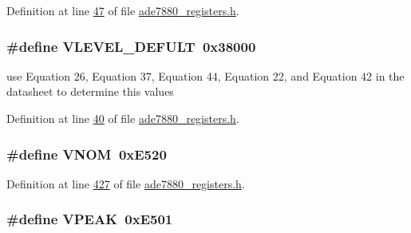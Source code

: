 Definition at line \hyperlink{a00036_source_l00047}{47} of file \hyperlink{a00036_source}{ade7880\-\_\-registers.\-h}.

\hypertarget{a00036_a489507ec5a9fe148bbc1b61afc07f27a}{
\subsubsection[{V\-L\-E\-V\-E\-L\-\_\-\-D\-E\-F\-U\-L\-T}]{\setlength{\rightskip}{0pt plus 5cm}\#define V\-L\-E\-V\-E\-L\-\_\-\-D\-E\-F\-U\-L\-T~0x38000}}\label{de/d8c/a00036_a489507ec5a9fe148bbc1b61afc07f27a}


use Equation 26, Equation 37, Equation 44, Equation 22, and Equation 42 in the datasheet to determine this values 



Definition at line \hyperlink{a00036_source_l00040}{40} of file \hyperlink{a00036_source}{ade7880\-\_\-registers.\-h}.

\hypertarget{a00036_a7f5107f4dbb40b5aa9f3e6de81d5b1e9}{
\subsubsection[{V\-N\-O\-M}]{\setlength{\rightskip}{0pt plus 5cm}\#define V\-N\-O\-M~0x\-E520}}\label{de/d8c/a00036_a7f5107f4dbb40b5aa9f3e6de81d5b1e9}


Definition at line \hyperlink{a00036_source_l00427}{427} of file \hyperlink{a00036_source}{ade7880\-\_\-registers.\-h}.

\hypertarget{a00036_a90d5d59f51c3ee67d2578e9f1799b5ea}{
\subsubsection[{V\-P\-E\-A\-K}]{\setlength{\rightskip}{0pt plus 5cm}\#define V\-P\-E\-A\-K~0x\-E501}}\label{de/d8c/a00036_a90d5d59f51c3ee67d2578e9f1799b5ea}


